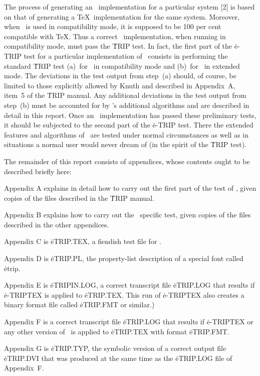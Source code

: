 The process of generating an \eTeX\ implementation for a particular
system [2] is based on that of generating a \TeX\ implementation for the
same system.  Moreover, when \eTeX\ is used in compatibility mode, it is
supposed to be 100 per cent compatible with \TeX.  Thus a correct \eTeX\
implementation, when running in compatibility mode, must pass the
\.{TRIP} test.  In fact, the first part of the \.{e-TRIP} test for a
particular implementation of \eTeX\ consists in performing the standard
\.{TRIP} test (a)~for \eTeX\ in compatibility mode and (b)~for \eTeX\ in
extended mode.  The deviations in the test output from step~(a) should,
of course, be limited to those explicitly allowed by Knuth and described
in Appendix~A, item~5 of the \.{TRIP} manual.  Any additional deviations
in the test output from step~(b) must be accounted for by \eTeX's
additional algorithms and are described in detail in this report.  Once
an \eTeX\ implementation has passed these preliminary tests, it should be
subjected to the second part of the \.{e-TRIP} test.  There the extended
features and algorithms of \eTeX\ are tested under normal circumstances
as well as in situations a normal user would never dream of (in the
spirit of the \.{TRIP} test).

The remainder of this report consists of appendices, whose contents ought
to be described briefly here:

Appendix A explains in detail how to carry out the first part of the
test of \eTeX, given copies of the files described in the \.{TRIP}
manual.

Appendix B explains how to carry out the \eTeX\ specific test, given
copies of the files described in the other appendices.

Appendix C is \.{eTRIP.TEX}, a fiendish test file for \eTeX.

Appendix D is \.{eTRIP.PL}, the property-list description of a
special font called \.{etrip}.

Appendix E is \.{eTRIPIN.LOG}, a correct transcript file \.{eTRIP.LOG}
that results if \.{e-TRIPTEX} is applied to \.{eTRIP.TEX}.
This run of \.{e-TRIPTEX} also creates a binary format file called
\.{eTRIP.FMT} or similar.)

Appendix F is a correct transcript file \.{eTRIP.LOG} that results if
\.{e-TRIPTEX} or any other version of \eTeX\ is applied to \.{eTRIP.TEX}
with format \.{eTRIP.FMT}.

Appendix G is \.{eTRIP.TYP}, the symbolic version of a correct output
file \.{eTRIP.DVI} that was produced at the same time as the
\.{eTRIP.LOG} file of Appendix~F.

